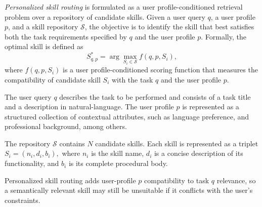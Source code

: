 \documentclass[letterpaper]{article} %
\begin{document}
\iffalse
\textit{Personalized skill routing} is formulated as a user profile-conditioned
retrieval problem over a repository of candidate skills. Given a user query
$q$, a user profile $p$, and a skill repository
$\mathcal{S}$, the objective is to identify the skill
that best satisfies both the task requirements specified by $q$ and the user profile $p$. Formally,
the optimal skill is defined as
\begin{equation}
S_{q,p}^{*}
=
\arg\max_{S_i\in\mathcal{S}}
f(q,p,S_i),
\label{eq:personalized_skill_routing}
\end{equation}
where $f(q,p,S_i)$ is a user profile-conditioned scoring function that measures
the compatibility of candidate skill $S_i$ with the task $q$ and the user profile $p$.

The user query $q$ describes the task to be performed and consists of a task title and a description in natural-language.
The user profile $p$  is represented as a structured collection of contextual attributes, such as language preference, and professional background, among others.

The repository $\mathcal{S}$ contains $N$ candidate skills. Each skill is
represented as a triplet $S_i=(n_i,d_i,b_i),$ where $n_i$ is the skill name, $d_i$ is a concise description of its
functionality, and $b_i$ is its complete procedural body. 

Personalized skill routing adds user-profile $p$ compatibility to task $q$ relevance, so a semantically relevant skill may still be unsuitable if it conflicts with the user's constraints.
\end{document}
